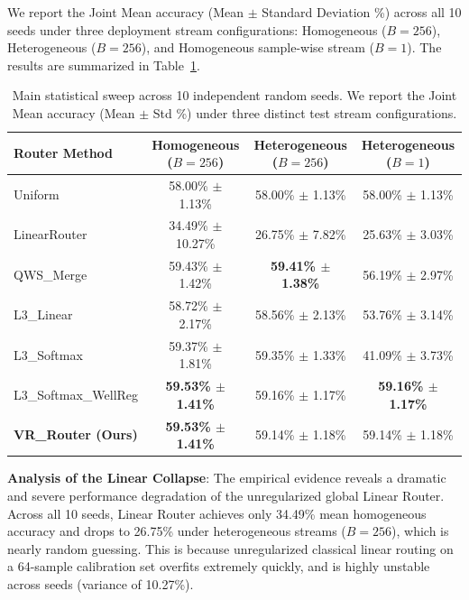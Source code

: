 We report the Joint Mean accuracy (Mean $\pm$ Standard Deviation \%) across all 10 seeds under three deployment stream configurations: Homogeneous ($B=256$), Heterogeneous ($B=256$), and Homogeneous sample-wise stream ($B=1$). The results are summarized in Table~\ref{tab:main_results}.

\begin{table}[t]
\caption{Main statistical sweep across 10 independent random seeds. We report the Joint Mean accuracy (Mean $\pm$ Std \%) under three distinct test stream configurations.}
\label{tab:main_results}
\vskip 0.15in
\begin{center}
\begin{small}
\begin{sc}
\setlength{\tabcolsep}{9pt}
\begin{tabular}{lccc}
\toprule
Router Method & Homogeneous ($B=256$) & Heterogeneous ($B=256$) & Heterogeneous ($B=1$) \\
\midrule
Uniform       & 58.00\% $\pm$ 1.13\% & 58.00\% $\pm$ 1.13\% & 58.00\% $\pm$ 1.13\% \\
LinearRouter  & 34.49\% $\pm$ 10.27\% & 26.75\% $\pm$ 7.82\% & 25.63\% $\pm$ 3.03\% \\
QWS\_Merge    & 59.43\% $\pm$ 1.42\% & \textbf{59.41\% $\pm$ 1.38\%} & 56.19\% $\pm$ 2.97\% \\
L3\_Linear    & 58.72\% $\pm$ 2.17\% & 58.56\% $\pm$ 2.13\% & 53.76\% $\pm$ 3.14\% \\
L3\_Softmax   & 59.37\% $\pm$ 1.81\% & 59.35\% $\pm$ 1.33\% & 41.09\% $\pm$ 3.73\% \\
L3\_Softmax\_WellReg & \textbf{59.53\% $\pm$ 1.41\%} & 59.16\% $\pm$ 1.17\% & \textbf{59.16\% $\pm$ 1.17\%} \\
\midrule
\textbf{VR\_Router (Ours)} & \textbf{59.53\% $\pm$ 1.41\%} & 59.14\% $\pm$ 1.18\% & 59.14\% $\pm$ 1.18\% \\
\bottomrule
\end{tabular}
\end{sc}
\end{small}
\end{center}
\vskip -0.1in
\end{table}

\textbf{Analysis of the Linear Collapse}: The empirical evidence reveals a dramatic and severe performance degradation of the unregularized global Linear Router. Across all 10 seeds, Linear Router achieves only 34.49\% mean homogeneous accuracy and drops to 26.75\% under heterogeneous streams ($B=256$), which is nearly random guessing. This is because unregularized classical linear routing on a 64-sample calibration set overfits extremely quickly, and is highly unstable across seeds (variance of 10.27\%).

